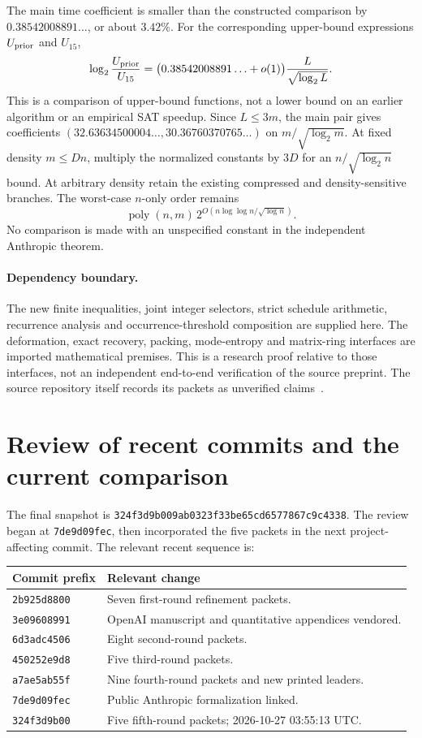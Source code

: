 \documentclass[11pt]{article}
\newcommand{\poly}{\operatorname{poly}}
\newcommand{\pin}{\texttt{324f3d9b009ab0323f33be65cd6577867c9c4338}}
\begin{document}
The main time coefficient is smaller than the constructed comparison by
$0.38542008891\ldots$, or about $3.42\%$. For the corresponding upper-bound
expressions $U_{\rm prior}$ and $U_{15}$,
\[
 \log_2\frac{U_{\rm prior}}{U_{15}}
 =\bigl(0.38542008891\ldots+o(1)\bigr)
       \frac{L}{\sqrt{\log_2L}}.
\]
This is a comparison of upper-bound functions, not a lower bound on an
earlier algorithm or an empirical SAT speedup. Since $L\le3m$, the main
pair gives coefficients
$(32.63634500004\ldots,30.36760370765\ldots)$ on
$m/\sqrt{\log_2m}$. At fixed density $m\le Dn$, multiply the normalized
constants by $3D$ for an $n/\sqrt{\log_2n}$ bound. At arbitrary density
retain the existing compressed and density-sensitive branches. The
worst-case $n$-only order remains
\[
 \poly(n,m)\,2^{O(n\log\log n/\sqrt{\log n})}.
\]
No comparison is made with an unspecified constant in the independent
Anthropic theorem.

\paragraph{Dependency boundary.}
The new finite inequalities, joint integer selectors, strict schedule
arithmetic, recurrence analysis and occurrence-threshold composition are
supplied here. The deformation, exact recovery, packing, mode-entropy and
matrix-ring interfaces are imported mathematical premises. This is a
research proof relative to those interfaces, not an independent end-to-end
verification of the source preprint. The source repository itself records
its packets as unverified claims~\cite{project}.

\section{Review of recent commits and the current comparison}
\label{sec:review}

The final snapshot is \pin. The review began at \texttt{7de9d09fec}, then
incorporated the five packets in the next project-affecting commit.
The relevant recent sequence is:
\begin{center}\small
\begin{tabular}{p{2.9cm}p{10.8cm}}
\toprule Commit prefix & Relevant change\\
\midrule
\texttt{2b925d8800} & Seven first-round refinement packets.\\
\texttt{3e09608991} & OpenAI manuscript and quantitative appendices vendored.\\
\texttt{6d3adc4506} & Eight second-round packets.\\
\texttt{450252e9d8} & Five third-round packets.\\
\texttt{a7ae5ab55f} & Nine fourth-round packets and new printed leaders.\\
\texttt{7de9d09fec} & Public Anthropic formalization linked.\\
\texttt{324f3d9b00} & Five fifth-round packets; 2026-10-27 03:55:13 UTC.\\
\bottomrule
\end{tabular}
\end{center}
\end{document}
